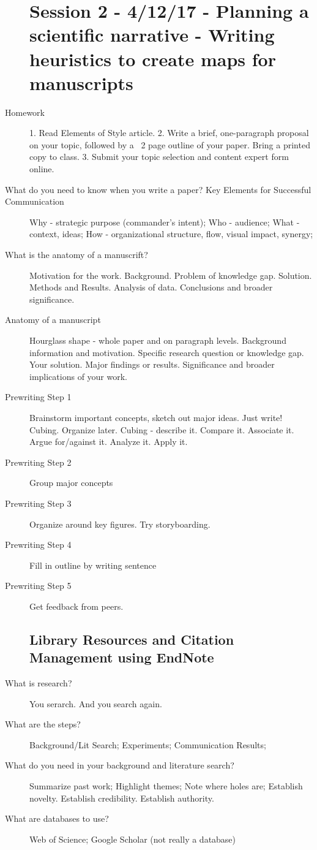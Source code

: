 \documentclass[10pt]{article}
\begin{document}
\begin{description}
\section{Session 2 - 4/12/17 - Planning a scientific narrative - Writing heuristics to create maps for manuscripts}
\item[Homework]
  1. Read Elements of Style article.
  2. Write a brief, one-paragraph proposal on your topic, followed by a ~2 page outline of your paper. Bring a printed copy to class.
  3. Submit your topic selection and content expert form online.
\item[What do you need to know when you write a paper? Key Elements for Successful Communication]
  Why - strategic purpose (commander's intent);
  Who - audience;
  What - context, ideas;
  How - organizational structure, flow, visual impact, synergy;
\item[What is the anatomy of a manuscrift?]
  Motivation for the work. Background.
  Problem of knowledge gap. Solution. Methods and Results.
  Analysis of data. Conclusions and broader significance.
\item[Anatomy of a manuscript]
  Hourglass shape - whole paper and on paragraph levels.
  Background information and motivation.
  Specific research question or knowledge gap.
  Your solution.
  Major findings or results.
  Significance and broader implications of your work.
\item[Prewriting Step 1]
  Brainstorm important concepts, sketch out major ideas.
  Just write! Cubing. Organize later.
  Cubing - describe it. Compare it. Associate it. Argue for/against it. Analyze it. Apply it.
\item[Prewriting Step 2]
  Group major concepts
\item[Prewriting Step 3]
  Organize around key figures. Try storyboarding.
\item[Prewriting Step 4]
  Fill in outline by writing sentence
\item[Prewriting Step 5]
  Get feedback from peers.
\subsection{Library Resources and Citation Management using EndNote}
\item[What is research?]
  You serarch. And you search again.
\item[What are the steps?]
  Background/Lit Search;
  Experiments;
  Communication Results;
\item[What do you need in your background and literature search?]
  Summarize past work;
  Highlight themes;
  Note where holes are;
  Establish novelty. Establish credibility. Establish authority.
\item[What are databases to use?]
  Web of Science; Google Scholar (not really a database)
\end{description}
\end{document}
